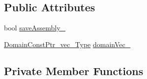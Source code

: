 \subsection*{Public Attributes}
\begin{DoxyCompactItemize}
\item 
bool \hyperlink{classFEDD_1_1FE__Test_a9d4fe8878ab5ce8bf7817b2b7f57b1fc}{save\+Assembly\+\_\+}
\item 
\hyperlink{classFEDD_1_1FE__Test_a3345ab320c9e19d77dc7fec9645da0d0}{Domain\+Const\+Ptr\+\_\+vec\+\_\+\+Type} \hyperlink{classFEDD_1_1FE__Test_ad429d8e769350d7ab954942729d77674}{domain\+Vec\+\_\+}
\end{DoxyCompactItemize}
\subsection*{Private Member Functions}

